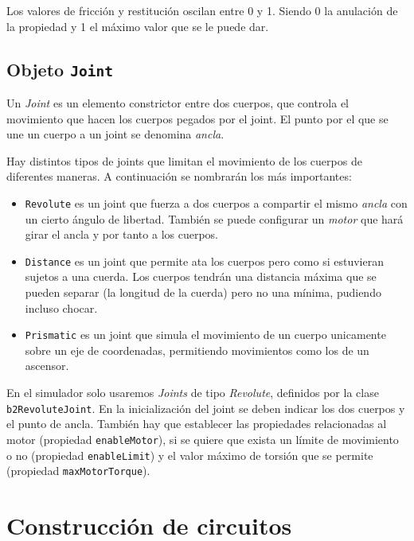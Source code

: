 Los valores de fricción y restitución oscilan entre 0 y 1. Siendo 0 la anulación de la propiedad y 1 el máximo valor que se le puede dar.


\section*{Objeto \texttt{Joint}}


Un \emph{Joint} es un elemento constrictor entre dos cuerpos, que controla el movimiento que hacen los cuerpos pegados por el joint. El punto por el que se une un cuerpo a un joint se denomina \emph{ancla}.

Hay distintos tipos de joints que limitan el movimiento de los cuerpos de diferentes maneras. A continuación se nombrarán los más importantes:

\begin{itemize}
	\item \texttt{Revolute} es un joint que fuerza a dos cuerpos a compartir el mismo \emph{ancla} con un cierto ángulo de libertad. También se puede configurar un \emph{motor} que hará girar el ancla y por tanto a los cuerpos.
	\item \texttt{Distance} es un joint que permite ata los cuerpos pero como si estuvieran sujetos a una cuerda. Los cuerpos tendrán una distancia máxima que se pueden separar (la longitud de la cuerda) pero no una mínima, pudiendo incluso chocar.
	\item \texttt{Prismatic} es un joint que simula el movimiento de un cuerpo unicamente sobre un eje de coordenadas, permitiendo movimientos como los de un ascensor.
\end{itemize}

En el simulador solo usaremos \emph{Joints} de tipo \emph{Revolute}, definidos por la clase \texttt{b2RevoluteJoint}.  En la inicialización del joint se deben indicar los dos cuerpos y el punto de ancla. También hay que establecer las propiedades relacionadas al motor (propiedad \texttt{enableMotor}), si se quiere que exista un límite de movimiento o no (propiedad \texttt{enableLimit}) y el valor máximo de torsión que se permite (propiedad \texttt{maxMotorTorque}).






\chapter{Construcción de circuitos}
\label{sec:construccion-circuitos}

